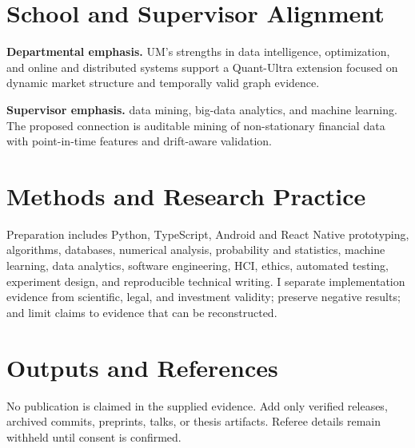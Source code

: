 \documentclass[11pt]{article}
\begin{document}
\section*{School and Supervisor Alignment}
\textbf{Departmental emphasis.} UM's strengths in data intelligence, optimization, and online and distributed systems support a Quant-Ultra extension focused on dynamic market structure and temporally valid graph evidence.

\textbf{Supervisor emphasis.} data mining, big-data analytics, and machine learning. The proposed connection is auditable mining of non-stationary financial data with point-in-time features and drift-aware validation.

\section*{Methods and Research Practice}
Preparation includes Python, TypeScript, Android and React Native prototyping, algorithms, databases, numerical analysis, probability and statistics, machine learning, data analytics, software engineering, HCI, ethics, automated testing, experiment design, and reproducible technical writing. I separate implementation evidence from scientific, legal, and investment validity; preserve negative results; and limit claims to evidence that can be reconstructed.

\section*{Outputs and References}
No publication is claimed in the supplied evidence. Add only verified releases, archived commits, preprints, talks, or thesis artifacts. Referee details remain withheld until consent is confirmed.
\end{document}
